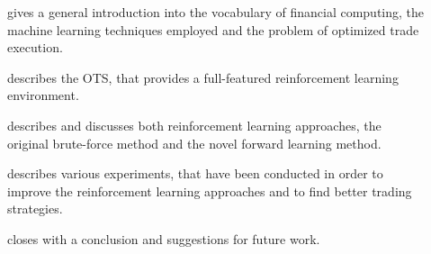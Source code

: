 \begin{description}
\item[] gives a general introduction into the vocabulary of financial computing, the machine learning techniques employed and the problem of optimized trade execution.
\item[] describes the \acl{OTS}, that provides a full-featured reinforcement learning environment.
\item[] describes and discusses both reinforcement learning approaches, \ie the original brute-force method and the novel forward learning method.
\item[] describes various experiments, that have been conducted in order to improve the reinforcement learning approaches and to find better trading strategies.
\item[] closes with a conclusion and suggestions for future work. 

\end{description}


\cleardoublepage{}
